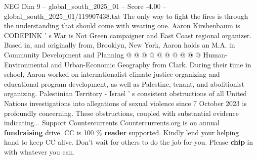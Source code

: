 \begin{textsample}{NEG Dim 9 – global\_south\_2025\_01 – Score -4.00 – global\_south\_2025\_01/119907438.txt}
The only way to fight the fires is through the understanding that should come with wearing one.
Aaron Kirshenbaum is CODEPINK ' s War is Not Green campaigner and East Coast regional organizer.
Based in, and originally from, Brooklyn, New York, Aaron holds an M.A. in Community Development and Planning @ @ @ @ @ @ @ @ @ @ Human-Environmental and Urban-Economic Geography from Clark.
During their time in school, Aaron worked on internationalist climate justice organizing and educational program development, as well as Palestine, tenant, and abolitionist organizing.
Palestinian Territory - Israel ' s consistent obstructions of all United Nations investigations into allegations of sexual violence since 7 October 2023 is profoundly concerning.
These obstructions, coupled with substantial evidence indicating...
Support Countercurrents Countercurrents.org is on annual \textbf{fundraising} drive.
CC is 100 \% \textbf{reader} supported.
Kindly lend your helping hand to keep CC alive.
Don't wait for others to do the job for you.
Please \textbf{chip} in with whatever you can.

\end{textsample}
